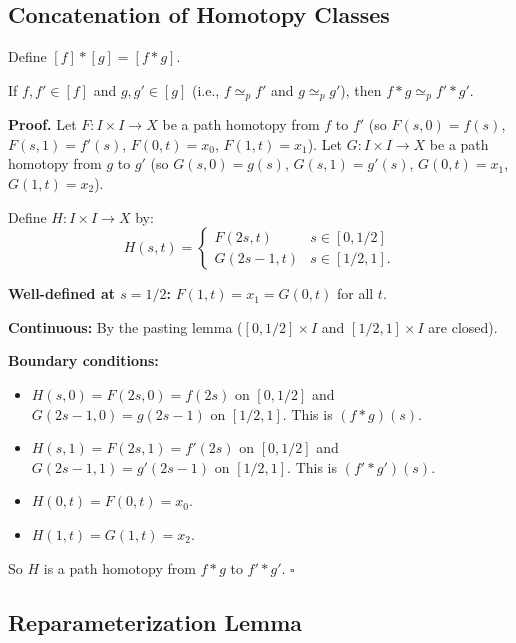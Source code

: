 \documentclass[11pt]{report}
\renewenvironment{proof}[1][Proof]{\noindent\textbf{#1.} }{\hfill$\square$\par\vspace{5pt}}
\begin{document}
\subsection{Concatenation of Homotopy Classes}

\begin{defbox}
Define $[f] * [g] = [f * g]$.
\end{defbox}

\begin{propbox}
If $f, f' \in [f]$ and $g, g' \in [g]$ (i.e., $f \simeq_p f'$ and $g \simeq_p g'$), then $f * g \simeq_p f' * g'$.
\end{propbox}

\begin{proof}
Let $F: I \times I \to X$ be a path homotopy from $f$ to $f'$ (so $F(s,0) = f(s)$, $F(s,1) = f'(s)$, $F(0,t) = x_0$, $F(1,t) = x_1$). Let $G: I \times I \to X$ be a path homotopy from $g$ to $g'$ (so $G(s,0) = g(s)$, $G(s,1) = g'(s)$, $G(0,t) = x_1$, $G(1,t) = x_2$).

Define $H: I \times I \to X$ by:
\[H(s, t) = \begin{cases} F(2s, t) & s \in [0, 1/2] \\ G(2s - 1, t) & s \in [1/2, 1]. \end{cases}\]

\textbf{Well-defined at $s = 1/2$:} $F(1, t) = x_1 = G(0, t)$ for all $t$. \checkmark

\textbf{Continuous:} By the pasting lemma ($[0, 1/2] \times I$ and $[1/2, 1] \times I$ are closed). \checkmark

\textbf{Boundary conditions:}
\begin{itemize}[nosep]
    \item $H(s, 0) = F(2s, 0) = f(2s)$ on $[0, 1/2]$ and $G(2s-1, 0) = g(2s-1)$ on $[1/2, 1]$. This is $(f * g)(s)$. \checkmark
    \item $H(s, 1) = F(2s, 1) = f'(2s)$ on $[0, 1/2]$ and $G(2s-1, 1) = g'(2s-1)$ on $[1/2, 1]$. This is $(f' * g')(s)$. \checkmark
    \item $H(0, t) = F(0, t) = x_0$. \checkmark
    \item $H(1, t) = G(1, t) = x_2$. \checkmark
\end{itemize}
So $H$ is a path homotopy from $f * g$ to $f' * g'$.
\end{proof}

\subsection{Reparameterization Lemma}
\end{document}
